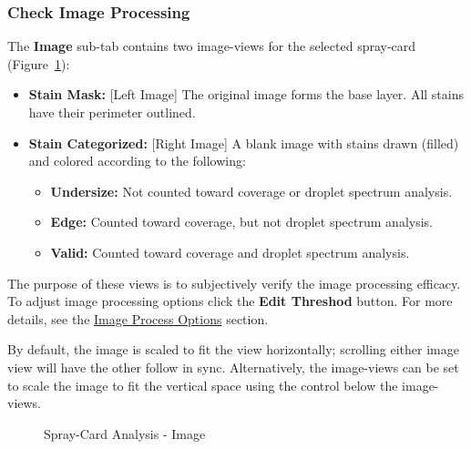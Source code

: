 \documentclass[10pt,letterpaper,titlepage]{article}
\begin{document}
    \subsubsection{Check Image Processing}
    The \textbf{Image} sub-tab contains two image-views for the selected spray-card (Figure~\ref{fig:card_image}):
    \begin{itemize}
        \item \textbf{Stain Mask:} [Left Image] The original image forms the base layer. All stains have their perimeter outlined.
        \item \textbf{Stain Categorized:} [Right Image] A blank image with stains drawn (filled) and colored according to the following:
        \begin{itemize}
            \item \textbf{Undersize:} Not counted toward coverage or droplet spectrum analysis.
            \item \textbf{Edge:} Counted toward coverage, but not droplet spectrum analysis.
            \item \textbf{Valid:} Counted toward coverage and droplet spectrum analysis.
        \end{itemize}
    \end{itemize}
    The purpose of these views is to subjectively verify the image processing efficacy. To adjust image processing options click the \textbf{Edit Threshod} button. For more details, see the \hyperref[sec:image_process]{Image Process Options} section.\par
    By default, the image is scaled to fit the view horizontally; scrolling either image view will have the other follow in sync. Alternatively, the image-views can be set to scale the image to fit the vertical space using the control below the image-views.
    \begin{figure}[hb]
        \centering
        \caption{Spray-Card Analysis - Image}
        \label{fig:card_image}
    \end{figure}
    \FloatBarrier
\end{document}
